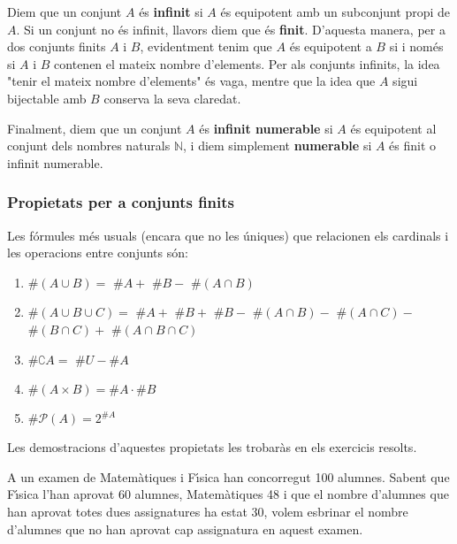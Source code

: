 \bigskip

Diem que un conjunt $A$ \'{e}s \textbf{infinit} si $A$ \'{e}s equipotent amb
un subconjunt propi de $A$. Si un conjunt no \'{e}s infinit, llavors diem
que \'{e}s \textbf{finit}. D'aquesta manera, per a dos conjunts finits $A$ i
$B$, evidentment tenim que $A$ \'{e}s equipotent a $B$ si i nom\'{e}s si $A$
i $B$ contenen el mateix nombre d'elements. Per als conjunts infinits, la
idea "tenir el mateix nombre d'elements" \'{e}s vaga, mentre que la idea que
$A$ sigui bijectable amb $B$ conserva la seva claredat.

\bigskip

Finalment, diem que un conjunt $A$ \'{e}s \textbf{infinit numerable} si $A$
\'{e}s equipotent al conjunt dels nombres naturals $\mathbb{N}$, i diem
simplement \textbf{numerable} si $A$ \'{e}s finit o infinit numerable.

\subsubsection{Propietats per a conjunts finits}

Les f\'{o}rmules m\'{e}s usuals (encara que no les \'{u}niques) que
relacionen els cardinals i les operacions entre conjunts s\'{o}n:

\begin{enumerate}
\item $\#\left( A\cup B\right) =$ $\#A+$ $\#B-$ $\#\left( A\cap B\right) $

\item $\#\left( A\cup B\cup C\right) =$ $\#A+$ $\#B+$ $\#B-$ $\#\left( A\cap
B\right) -$ $\#\left( A\cap C\right) -$ $\#\left( B\cap C\right) +$ $%
\#\left( A\cap B\cap C\right) $

\item $\#\complement A=$ $\#U-\#A$

\item $\#\left( A\times B\right) =\#A\cdot\#B$

\item $\#\mathcal{P}(A)=2^{\#A}$
\end{enumerate}

Les demostracions d'aquestes propietats les trobar\`{a}s en els exercicis
resolts.

\begin{exemple}
A un examen de Matem\`{a}tiques i F\'{\i}sica han concorregut 100 alumnes.
Sabent que F\'{\i}sica l'han aprovat 60 alumnes, Matem\`{a}tiques 48 i que
el nombre d'alumnes que han aprovat totes dues assignatures ha estat 30,
volem esbrinar el nombre d'alumnes que no han aprovat cap assignatura en
aquest examen.
\end{exemple}

